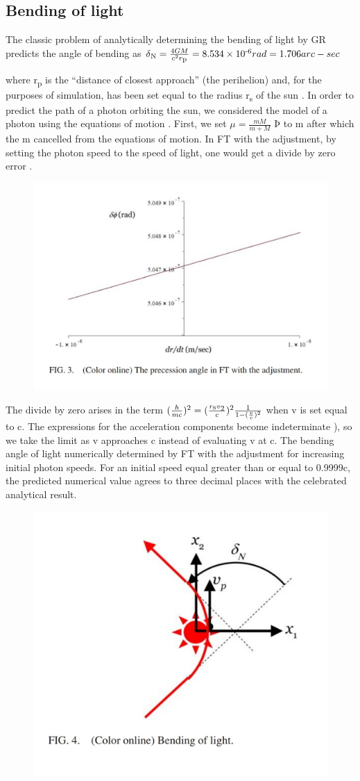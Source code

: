 \documentclass[12pt]{article}
\begin{document}
\subsection{Bending of light}
 The classic problem of analytically determining the
bending of light by GR predicts the angle of bending as 
$\delta\textsubscript{N}=\frac{4GM}{c^2 r\textsubscript{p}} \\
=8.534\times 10\textsuperscript{-6} rad \\
= 1.706arc-sec$

where r\textsubscript{p} is the “distance of closest approach” (the perihelion) and, for the purposes of simulation, has been set equal
to the radius r\textsubscript{s} of the sun . In order to predict the
path of a photon orbiting the sun, we considered the model
of a photon using the equations of motion . First,
we set $ \mu =\frac{mM}{m+M}$ Þ to m after which the m cancelled
from the equations of motion. In FT with the adjustment, by
setting the photon speed to the speed of light, one would get
a divide by zero error .
\begin{figure}[htbp]
    \includegraphics[width=0.6\linewidth]{IMG_20210218_183628.jpg}
\end{figure}
The divide by zero arises in the
term $(\frac{h}{mc})^2 = (\frac{r\textsubscript{s}v\textsubscript{2}}{c})^2 \frac{1}{1-(\frac{v}{c})^2}$
when v is set equal to c.
The expressions for the acceleration components become
indeterminate ), so we take the limit as v approaches c
instead of evaluating v at c. The bending angle of light numerically
determined by FT with the adjustment for increasing initial
photon speeds. For an initial speed equal greater than or
equal to 0.9999c, the predicted numerical value agrees to
three decimal places with the celebrated analytical result.
\begin{figure}[htbp]
    \includegraphics[width=0.6\linewidth, right]{IMG_20210218_183644.jpg}
\end{figure}
\end{document}
